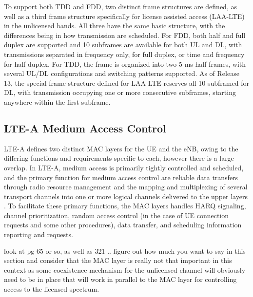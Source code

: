 To support both TDD and FDD, two distinct frame structures are defined, as well as a third frame structure specifically for license assisted access (LAA-LTE) in the unlicensed bands.  All three have the same basic structure, with the differences being in how transmission are scheduled.  For FDD, both half and full duplex are supported and 10 subframes are available for both UL and DL, with transmissions separated in frequency only, for full duplex, or time and frequency for half duplex.  For TDD, the frame is organized into two 5 ms half-frames, with several UL/DL configurations and switching patterns supported.  As of Release 13, the special frame structure defined for LAA-LTE reserves all 10 subframed for DL, with transmission occupying one or more consecutive subframes, starting anywhere within the first subframe.


\subsection{LTE-A Medium Access Control}
\label{lte-mac}
LTE-A defines two distinct MAC layers for the UE and the eNB, owing to the differing functions and requirements specific to each, however there is a large overlap.  In LTE-A, medium access is primarily tightly controlled and scheduled, and the primary function for medium access control are reliable data transfers through radio resource management and the mapping and multiplexing of several transport channels into one or more logical channels delivered to the upper layers \cite{tr36321}. To facilitate these primary functions, the MAC layers handles HARQ signaling, channel prioritization, random access control (in the case of UE connection requests and some other procedures), data transfer, and scheduling information reporting and requests.  


look at \cite{tr36300} pg 65 or so, as well as 321 .. figure out how much you want to say in this section and consider that the MAC layer is really not that important in this context as some coexistence mechanism for the unlicensed channel will obviously need to be in place that will work in parallel to the MAC layer for controlling access to the licensed spectrum.


